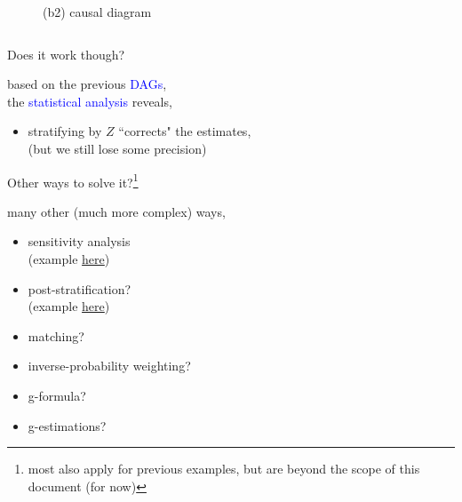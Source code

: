 \begin{frame}
\begin{columns}
\begin{column}{0.5\textwidth}
\begin{figure}
				\caption*{(b2) causal diagram}
			\end{figure}
		\end{column}
	\end{columns}
\end{frame}
%
%
\begin{lhframe}[rhgraphic={\texttt{[image: collider1\_samplesize2.pdf]}}]
	{Does it work though?}
	
	based on the previous \textcolor{blue}{DAGs}, \\
	the \textcolor{blue}{statistical analysis} reveals,
	\begin{itemize}
		\item stratifying by $Z$ ``corrects" the estimates, \\
		{\small (but we still lose some precision) }
	\end{itemize}
\end{lhframe}
%
%
\begin{frame}
	{Other ways to solve it?\footnote{most also apply for previous examples, but are beyond the scope of this document (for now)}}
	
	many other (much more complex) ways,
	\begin{itemize}
		\item sensitivity analysis \\
		{\small (example \hyperlink{sa}{here})}
		\item post-stratification? \\
		{\small (example \hyperlink{sa}{here})}
		\item matching?
		\item inverse-probability weighting?
		\item g-formula?
		\item g-estimations?
	\end{itemize}
\end{frame}
%
%
